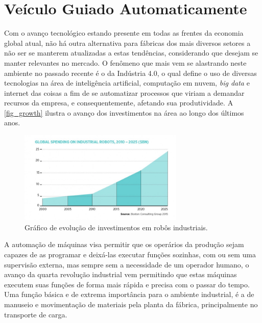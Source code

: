\section{Ve{\'i}culo Guiado Automaticamente}

Com o avanço tecnológico estando presente em todas as frentes da economia
global atual, não há outra alternativa para fábricas dos mais diversos setores
a não ser se manterem atualizadas a estas tendências, considerando que desejam se
manter relevantes no mercado. O fenômeno que mais vem se alastrando neste
ambiente no passado recente é o da Indústria 4.0, o qual define o uso de
diversas tecnologias na área de inteligência artificial, computação em nuvem,
\textit{big data} e internet das coisas a fim de se automatizar processos que viriam a
demandar recursos da empresa, e consequentemente, afetando sua produtividade.
A \autoref{fig_growth} ilustra o avan{\c c}o dos investimentos na {\'a}rea ao longo
dos {\'u}ltimos anos.

\begin{figure}[htb]
        \centering
        \caption{\label{fig_growth}Gr{\'a}fico de evolu{\c c}{\~a}o de investimentos em rob{\^o}s industriais.}
        \includegraphics[width=0.7\textwidth]{images/Global-spending-industrial-robots-760x428.png}
\end{figure}


A automação de máquinas visa permitir que os operários da produção sejam
capazes de as programar e deixá-las executar funções sozinhas, com ou sem uma
supervisão externa, mas sempre sem a necessidade de um operador humano, o
avanço da quarta revolução industrial vem permitindo que estas máquinas
executem suas funções de forma mais rápida e precisa com o passar do tempo. Uma
função básica e de extrema importância para o ambiente industrial, é a de
manuseio e movimentação de materiais pela planta da fábrica, principalmente no
transporte de carga. 

